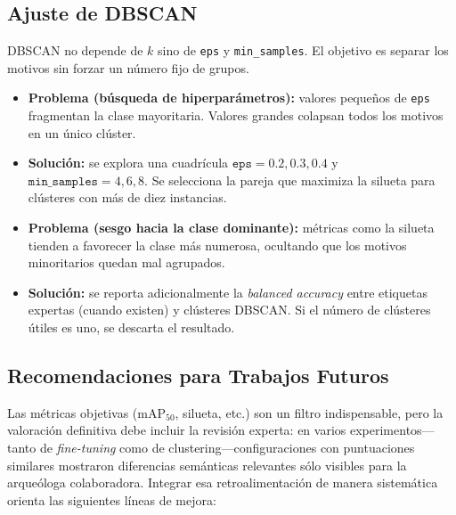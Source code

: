 \subsection{Ajuste de DBSCAN}\label{ssec:dbscan}

DBSCAN no depende de \(k\) sino de \texttt{eps} y \texttt{min\_samples}.
El objetivo es separar los motivos sin forzar un número fijo de grupos.

\begin{itemize}
  \item \textbf{Problema (búsqueda de hiperparámetros):} valores pequeños de \texttt{eps} fragmentan la clase mayoritaria.
  Valores grandes colapsan todos los motivos en un único clúster.
  \item \textbf{Solución:} se explora una cuadrícula \(\texttt{eps}=0.2,0.3,0.4\) y \(\texttt{min\_samples}=4,6,8\).
  Se selecciona la pareja que maximiza la silueta para clústeres con más de diez instancias.

  \item \textbf{Problema (sesgo hacia la clase dominante):} métricas como la silueta tienden a favorecer la clase más numerosa, ocultando que los motivos minoritarios quedan mal agrupados.
  \item \textbf{Solución:} se reporta adicionalmente la \emph{balanced accuracy} entre etiquetas expertas (cuando existen) y clústeres DBSCAN.
  Si el número de clústeres útiles es uno, se descarta el resultado.
\end{itemize}

\subsection{Recomendaciones para Trabajos Futuros}

Las métricas objetivas (\(\text{mAP}_{50}\), silueta, etc.) son un filtro indispensable, pero la valoración definitiva debe incluir la revisión experta: en varios experimentos—tanto de \emph{fine-tuning} como de clustering—configuraciones con puntuaciones similares mostraron diferencias semánticas relevantes sólo visibles para la arqueóloga colaboradora.
Integrar esa retroalimentación de manera sistemática orienta las siguientes líneas de mejora:

